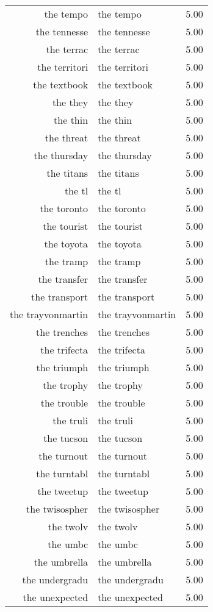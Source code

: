 \begin{table}[ht]
\begin{tabular}{rlr}
  the tempo & the tempo & 5.00 \\ 
  the tennesse & the tennesse & 5.00 \\ 
  the terrac & the terrac & 5.00 \\ 
  the territori & the territori & 5.00 \\ 
  the textbook & the textbook & 5.00 \\ 
  the they & the they & 5.00 \\ 
  the thin & the thin & 5.00 \\ 
  the threat & the threat & 5.00 \\ 
  the thursday & the thursday & 5.00 \\ 
  the titans & the titans & 5.00 \\ 
  the tl & the tl & 5.00 \\ 
  the toronto & the toronto & 5.00 \\ 
  the tourist & the tourist & 5.00 \\ 
  the toyota & the toyota & 5.00 \\ 
  the tramp & the tramp & 5.00 \\ 
  the transfer & the transfer & 5.00 \\ 
  the transport & the transport & 5.00 \\ 
  the trayvonmartin & the trayvonmartin & 5.00 \\ 
  the trenches & the trenches & 5.00 \\ 
  the trifecta & the trifecta & 5.00 \\ 
  the triumph & the triumph & 5.00 \\ 
  the trophy & the trophy & 5.00 \\ 
  the trouble & the trouble & 5.00 \\ 
  the truli & the truli & 5.00 \\ 
  the tucson & the tucson & 5.00 \\ 
  the turnout & the turnout & 5.00 \\ 
  the turntabl & the turntabl & 5.00 \\ 
  the tweetup & the tweetup & 5.00 \\ 
  the twisospher & the twisospher & 5.00 \\ 
  the twolv & the twolv & 5.00 \\ 
  the umbc & the umbc & 5.00 \\ 
  the umbrella & the umbrella & 5.00 \\ 
  the undergradu & the undergradu & 5.00 \\ 
  the unexpected & the unexpected & 5.00 \\ 

\end{tabular}
\end{table}
